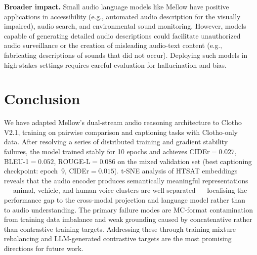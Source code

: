 \documentclass[cameraready]{Interspeech}
\begin{document}
\textbf{Broader impact.}
Small audio language models like Mellow have positive applications in accessibility (e.g.,
automated audio description for the visually impaired), audio search, and environmental sound
monitoring. However, models capable of generating detailed audio descriptions could
facilitate unauthorized audio surveillance or the creation of misleading audio-text content
(e.g., fabricating descriptions of sounds that did not occur). Deploying such models in
high-stakes settings requires careful evaluation for hallucination and bias.

\section{Conclusion}
\label{sec:conclusion}

We have adapted Mellow's dual-stream audio reasoning architecture to Clotho V2.1, training on
pairwise comparison and captioning tasks with Clotho-only data. After resolving a series of
distributed training and gradient stability failures, the model trained stably for 10 epochs
and achieves CIDEr$=0.027$, BLEU-1$=0.052$, ROUGE-L$=0.086$ on the mixed validation set
(best captioning checkpoint: epoch~9, CIDEr$=0.015$).
t-SNE analysis of HTSAT embeddings reveals that the audio encoder produces semantically
meaningful representations — animal, vehicle, and human voice clusters are well-separated —
localising the performance gap to the cross-modal projection and language model rather than
to audio understanding. The primary failure modes are MC-format contamination from training
data imbalance and weak grounding caused by concatenative rather than contrastive training
targets. Addressing these through training mixture rebalancing and LLM-generated contrastive
targets are the most promising directions for future work.




\end{document}
